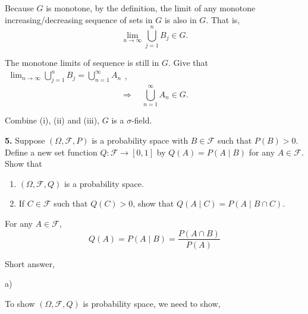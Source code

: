\documentclass[12pt,thmsa]{article}
\begin{document}
Because \(G\) is monotone, by the definition, the limit of any monotone increasing/decreasing sequence of sets in \(G\) is also in \(G\). That is, \[\lim_{n \rightarrow \infty} \bigcup_{j=1}^{n} B_{j} \in G.\]

The monotone limits of sequence is still in \(G\). Give that \(\begin{aligned}\lim_{n \rightarrow \infty} \bigcup_{j=1}^{n} B_{j}=\bigcup_{n=1}^{\infty} A_{n}\end{aligned}\),
\[
\Rightarrow \quad \bigcup_{n=1}^{\infty} A_{n} \in G.
\]

Combine (i), (ii) and (iii), \(G\) is a \(\sigma\)-field.


\medskip


\noindent
{\bf 5.} Suppose \((\Omega, \mathcal{F}, P)\) is a probability space with \(B \in \mathcal{F}\) such that \(P(B)>0 \). Define a new set function \(Q: \mathcal{F} \rightarrow[0,1]\) by \(Q(A)=P(A \mid B)\) for any \(A \in \mathcal{F} \). Show that
\begin{enumerate}[label=\alph*)] %
	\item \((\Omega, \mathcal{F}, Q)\) is a probability space.
	
	\item If \(C \in \mathcal{F}\) such that \(Q(C)>0\), show that \(Q(A \mid C)=P(A \mid B \cap C)\).
\end{enumerate}

For any \(A \in \mathcal{F}\),
\[
Q(A)=P(A \mid B)=\frac{P(A \cap B)}{P(A)}
\]

\noindent
Short answer,

a)

To show \((\Omega, \mathcal{F}, Q)\) is probability space, we need to show,
\end{document}
